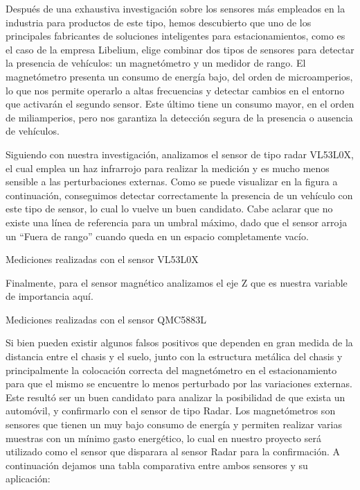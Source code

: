 

Después de una exhaustiva investigación sobre los sensores más empleados en la industria para productos de este tipo, 
hemos descubierto que uno de los principales fabricantes de soluciones inteligentes para estacionamientos, 
como es el caso de la empresa Libelium, elige combinar dos tipos de sensores para detectar la presencia de vehículos: 
un magnetómetro y un medidor de rango. El magnetómetro presenta un consumo de energía bajo, del orden de microamperios, 
lo que nos permite operarlo a altas frecuencias y detectar cambios en el entorno que activarán el segundo sensor. 
Este último tiene un consumo mayor, en el orden de miliamperios, pero nos garantiza la detección segura de la presencia o ausencia de vehículos.

Siguiendo con nuestra investigación, analizamos el sensor de tipo radar VL53L0X, el cual emplea un haz infrarrojo para realizar la 
medición y es mucho menos sensible a las perturbaciones externas. Como se puede visualizar en la figura a continuación, conseguimos 
detectar correctamente la presencia de un vehículo con este tipo de sensor, lo cual lo vuelve un buen candidato. Cabe aclarar que no existe 
una línea de referencia para un umbral máximo, dado que el sensor arroja un “Fuera de rango” cuando queda en un espacio completamente vacío.

\begin{images}[\label{VL53L0X_PLOTS}]{Mediciones realizadas con el sensor VL53L0X}
\end{images}


Finalmente, para el sensor magnético analizamos el eje Z que es nuestra variable de importancia aquí.
\begin{images}[\label{QMC5883L_PLOT}]{Mediciones realizadas con el sensor QMC5883L}
\end{images}


Si bien pueden existir algunos falsos positivos que dependen en gran medida de la
distancia entre el chasis y el suelo, junto con la estructura metálica del chasis y
principalmente la colocación correcta del magnetómetro en el estacionamiento para que el
mismo se encuentre lo menos perturbado por las variaciones externas. Este resultó ser un
buen candidato para analizar la posibilidad de que exista un automóvil, y confirmarlo
con el sensor de tipo Radar. Los magnetómetros son sensores que tienen un muy bajo
consumo de energía y permiten realizar varias muestras con un mínimo gasto energético,
lo cual en nuestro proyecto será utilizado como el sensor que disparara al sensor Radar
para la confirmación. A continuación dejamos una tabla comparativa entre ambos sensores
y su aplicación:

